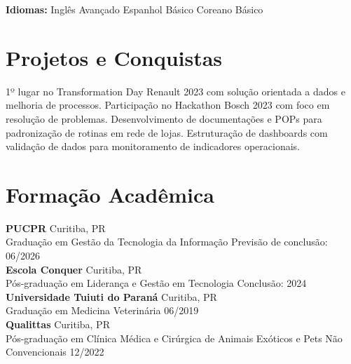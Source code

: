 \documentclass[11pt,a4paper]{article}
\begin{document}
\textbf{Idiomas:} Inglês Avançado \enspace\textbullet\enspace Espanhol Básico \enspace\textbullet\enspace Coreano Básico

\section{Projetos e Conquistas}

1º lugar no Transformation Day Renault 2023 com solução orientada a dados e melhoria de processos. Participação no Hackathon Bosch 2023 com foco em resolução de problemas. Desenvolvimento de documentações e POPs para padronização de rotinas em rede de lojas. Estruturação de dashboards com validação de dados para monitoramento de indicadores operacionais.

\section{Formação Acadêmica}

\textbf{PUCPR} \hfill Curitiba, PR\\
Graduação em Gestão da Tecnologia da Informação \hfill Previsão de conclusão: 06/2026\\[6pt]

\textbf{Escola Conquer} \hfill Curitiba, PR\\
Pós-graduação em Liderança e Gestão em Tecnologia \hfill Conclusão: 2024\\[6pt]

\textbf{Universidade Tuiuti do Paraná} \hfill Curitiba, PR\\
Graduação em Medicina Veterinária \hfill 06/2019\\[6pt]

\textbf{Qualittas} \hfill Curitiba, PR\\
Pós-graduação em Clínica Médica e Cirúrgica de Animais Exóticos e Pets Não Convencionais \hfill 12/2022
\end{document}
